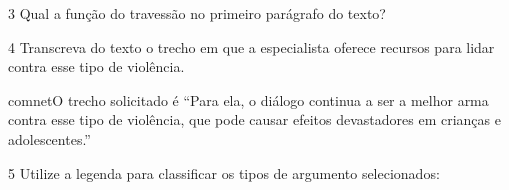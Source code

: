 {{\begin{escolha}

\num{3} Qual a função do travessão no primeiro parágrafo do texto?


\num{4} Transcreva do texto o trecho em que a especialista oferece recursos
para lidar contra esse tipo de violência. 

comnet{O trecho solicitado é ``Para ela, o diálogo continua a ser a melhor
arma contra esse tipo de violência, que pode causar efeitos devastadores em
crianças e adolescentes.''}

\num{5} Utilize a legenda para classificar os tipos de argumento selecionados:


\end{escolha}}}
